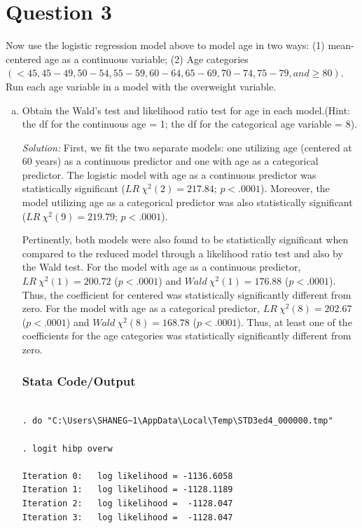 \documentclass{article}
\begin{document}
\section{Question 3} 
Now use the logistic regression model above to model age in two ways: (1) mean-centered age as a continuous variable; (2) Age categories $(<45, 45-49, 50-54, 55-59, 60-64, 65-69, 70-74, 75-79, and \geq 80). $
Run each age variable in a model with the overweight variable.
\begin{enumerate}[a.]
    \item  Obtain the Wald’s test and likelihood ratio test for age in each model.(Hint: the df for the continuous age = 1; the df for the categorical age variable = 8).
    
    \textit{Solution:} First, we fit the two separate models: one utilizing age (centered at 60 years) as a continuous predictor and one with age as a categorical predictor. The logistic model with age as a continuous predictor was statistically significant ($LR \ \chi^2(2) = 217.84$; $p < .0001$). Moreover, the model utilizing age as a categorical predictor was also statistically significant ($LR \ \chi^2(9) = 219.79$; $p < .0001$).

Pertinently, both models were also found to be statistically significant when compared to the reduced model through a likelihood ratio test and also by the Wald test. For the model with age as a continuous predictor, $LR \ \chi^2(1) = 200.72$ ($p < .0001$) and $Wald \ \chi^2(1) = 176.88$ ($p <.0001$). Thus, the coefficient for centered was statistically significantly different from zero. For the model with age as a categorical predictor, $LR \ \chi^2(8) = 202.67$ ($p < .0001$) and $Wald \ \chi^2(8) = 168.78$ ($p <.0001$). Thus, at least one of the coefficients for the age categories was statistically significantly different from zero. 

\subsubsection*{Stata Code/Output}
\begin{verbatim}
    
. do "C:\Users\SHANEG~1\AppData\Local\Temp\STD3ed4_000000.tmp"

. logit hibp overw

Iteration 0:   log likelihood = -1136.6058  
Iteration 1:   log likelihood = -1128.1189  
Iteration 2:   log likelihood =  -1128.047  
Iteration 3:   log likelihood =  -1128.047  


\end{verbatim}
\end{enumerate}
\end{document}
